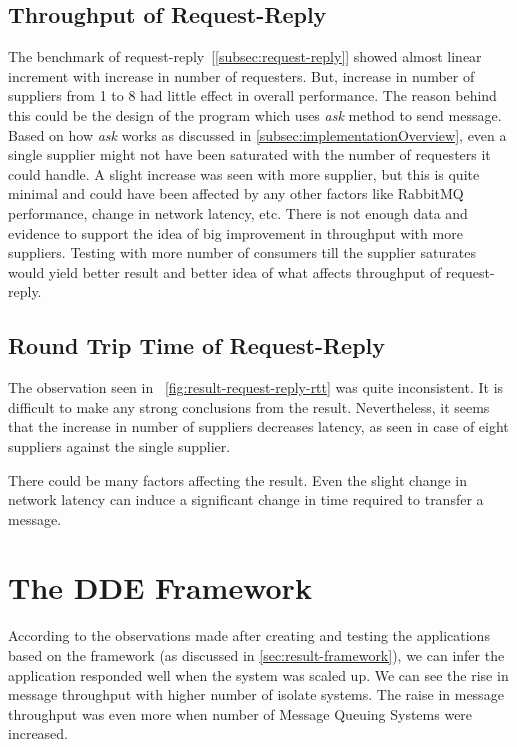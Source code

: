 \subsection{Throughput of Request-Reply}
  The benchmark of request-reply~[\autoref{subsec:request-reply}] showed almost linear increment with increase in number of requesters. But, increase in number of suppliers from 1 to 8 had little effect in overall performance. The reason behind this could be the design of the program which uses \emph{ask} method to send message. Based on how \emph{ask} works as discussed in \autoref{subsec:implementationOverview}, even a single supplier might not have been saturated with the number of requesters it could handle. A slight increase was seen with more supplier, but this is quite minimal and could have been affected by any other factors like RabbitMQ performance, change in network latency, etc. There is not enough data and evidence to support the idea of big improvement in throughput with more suppliers. Testing with more number of consumers till the supplier saturates would yield better result and better idea of what affects throughput of request-reply.

\subsection{Round Trip Time of Request-Reply}
  The observation seen in ~\autoref{fig:result-request-reply-rtt} was quite inconsistent. It is difficult to make any strong conclusions from the result. Nevertheless, it seems that the increase in number of suppliers decreases latency, as seen in case of eight suppliers against the single supplier.

  There could be many factors affecting the result. Even the slight change in network latency can induce a significant change in time required to transfer a message.

\section{The DDE Framework}
  According to the observations made after creating and testing the applications based on the framework (as discussed in \autoref{sec:result-framework}), we can infer the application responded well when the system was scaled up. We can see the rise in message throughput with higher number of isolate systems. The raise in message throughput was even more when number of Message Queuing Systems were increased.

